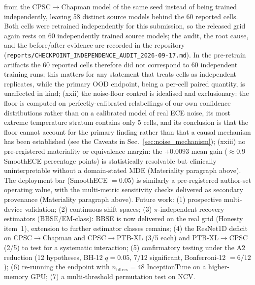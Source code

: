 \documentclass[review,12pt,nonatbib]{elsarticle}
\begin{document}
from the CPSC$\rightarrow$Chapman model of the same seed instead of being
trained independently, leaving 58 distinct source models behind the 60
reported cells. Both cells were retrained independently for this
submission, so the released grid again rests on 60 independently trained
source models; the audit, the root cause, and the before/after evidence
are recorded in the repository
(\texttt{reports/CHECKPOINT\_INDEPENDENCE\_AUDIT\_2026-09-17.md}). In the
pre-retrain artifacts the 60 reported cells therefore did not correspond
to 60 independent training runs; this matters for any statement that
treats cells as independent replicates, while the primary OOD endpoint,
being a per-cell paired quantity, is unaffected in kind; (xxii) the
noise-floor control is idealised and exclusionary: the floor is computed
on perfectly-calibrated relabellings of our own confidence
distributions rather than on a calibrated model of real ECE noise, its
most extreme temperature stratum contains only 5 cells, and its
conclusion is that the floor cannot account for the primary finding
rather than that a causal mechanism has been established (see the
Caveats in Sec.~\ref{sec:noise_mechanism}); (xxiii) no pre-registered
materiality or equivalence margin: the $+0.0093$ mean gain
($\approx0.9$ SmoothECE percentage points) is statistically resolvable
but clinically uninterpretable without a domain-stated MDE (Materiality
paragraph above).
The deployment bar (SmoothECE
$=0.05$) is similarly a pre-registered author-set operating
value, with the multi-metric sensitivity checks delivered as
secondary provenance (Materiality paragraph above).
Future work:
(1) prospective multi-device validation; (2) continuous shift spaces;
(3) $\pi$-independent recovery estimators (BBSE/EM-class): BBSE is now
delivered on the real grid (Honesty item~1), extension to further
estimator classes remains; (4) the ResNet1D deficit on
CPSC$\rightarrow$Chapman and CPSC$\rightarrow$PTB-XL (3/5 each) and
PTB-XL$\rightarrow$CPSC (2/5) to test
for a systematic interaction; (5) confirmatory testing under the A2
reduction (12 hypotheses, BH-12 $q=0.05$, 7/12 significant,
Bonferroni-12 $=6/12$); (6) re-running the endpoint with
$n_{\text{filters}}=48$ InceptionTime on a higher-memory GPU; (7) a
multi-threshold permutation test on NCV.

\end{document}
